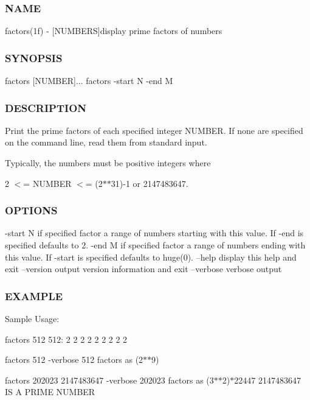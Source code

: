 \subsubsection*{N\+A\+ME}

factors(1f) -\/ \mbox{[}N\+U\+M\+B\+E\+RS\mbox{]}display prime factors of numbers 

\subsubsection*{S\+Y\+N\+O\+P\+S\+IS}

\begin{DoxyVerb}    factors [NUMBER]...
    factors -start N -end M
\end{DoxyVerb}


\subsubsection*{D\+E\+S\+C\+R\+I\+P\+T\+I\+ON}

Print the prime factors of each specified integer N\+U\+M\+B\+ER. If none are specified on the command line, read them from standard input.

Typically, the numbers must be positive integers where

2 $<$= N\+U\+M\+B\+ER $<$= (2$\ast$$\ast$31)-\/1 or 2147483647.

\subsubsection*{O\+P\+T\+I\+O\+NS}

-\/start N if specified factor a range of numbers starting with this value. If -\/end is specified defaults to 2. -\/end M if specified factor a range of numbers ending with this value. If -\/start is specified defaults to huge(0). --help display this help and exit --version output version information and exit --verbose verbose output \subsubsection*{E\+X\+A\+M\+P\+LE}

Sample Usage\+:

factors 512 512\+: 2 2 2 2 2 2 2 2 2

factors 512 -\/verbose 512 factors as (2$\ast$$\ast$9)

factors 202023 2147483647 -\/verbose 202023 factors as (3$\ast$$\ast$2)$\ast$22447 2147483647 IS A P\+R\+I\+ME N\+U\+M\+B\+ER

